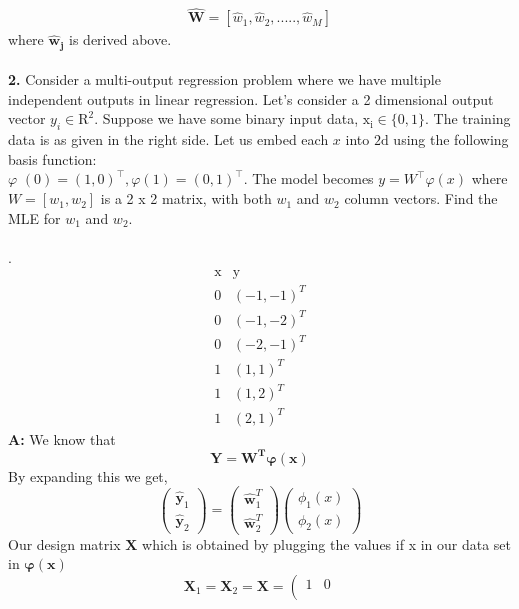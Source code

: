 \documentclass[english,a4paper,12pt]{article}
\begin{document}
\begin{enumerate}
\begin{itemize}
$$
\begin{aligned}
{\hat{\mathbf{W}}}=[\hat w_{1},\hat w_{2},.....,\hat w_{M}]
\end{aligned}
$$
where $\boldsymbol{\hat w_{j}}$ is derived above.\\~\\
\textbf{2.} Consider a multi-output regression problem where we have multiple independent outputs in linear regression. Let's consider a 2 dimensional output vector $y_{i} \in \mathrm{R}^2$. Suppose we have some binary input data, $\mathrm{x}_{\mathrm{i}} \in\{0,1\}$. The training data is as given in the right side. Let us embed each $x$ into $2 \mathrm{d}$ using the following basis function: \\
$\varphi$ $(0)=(1,0)^{\top}, \varphi(1)=(0,1)^{\top}$. The model becomes $y=W^{\top} \varphi(x)$ where $W=\left[w_{1}, w_{2}\right]$ is a 2
x 2 matrix, with both $w_{1}$ and $w_{2}$ column vectors. Find the MLE for $w_{1}$ and $w_{2}$.\\~\\.
$$
\begin{array}{c|l}
\mathrm{x} & \mathrm{y} \\
\hline 0 & (-1,-1)^{T} \\
0 & (-1,-2)^{T} \\
0 & (-2,-1)^{T} \\
1 & (1,1)^{T} \\
1 & (1,2)^{T} \\
1 & (2,1)^{T}
\end{array}
$$
\textbf{A:}
We know that $$\boldsymbol{Y}=\boldsymbol{W^{T}}\boldsymbol{\varphi(x)}$$
By expanding this we get,
$$
\left(\begin{array}{c}
\hat{\mathbf{y}}_{1} \\
\hat{\mathbf{y}}_{2}
\end{array}\right)=\left(\begin{array}{c}
\hat{\mathbf{w}}_{1}^{T} \\
\hat{\mathbf{w}}_{2}^{T}
\end{array}\right)\left(\begin{array}{l}
\phi_{1}(x) \\
\phi_{2}(x)
\end{array}\right)
$$
Our design matrix $\mathbf{X}$ which is obtained by plugging the values if x in our data set in $\mathbf{\varphi(x)}$\\
$$\mathbf{X}_{1}=\mathbf{X}_{2}=\mathbf{X}=\left(\begin{array}{ll}
1 & 0 \\

\end{array}$$
\end{itemize}
\end{enumerate}
\end{document}
